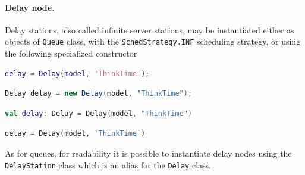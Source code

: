 \paragraph{Delay node.} Delay stations, also called infinite server stations, may be instantiated either as objects of \texttt{Queue} class, with the \texttt{SchedStrategy.INF} scheduling strategy, or using the following specialized constructor
\begin{MATLAB}
\begin{lstlisting}[language = matlab]
delay = Delay(model, 'ThinkTime');
\end{lstlisting}
\end{MATLAB}
\begin{JAVA}
\begin{lstlisting}[language = java, basicstyle=\ttfamily\scriptsize]
Delay delay = new Delay(model, "ThinkTime");
\end{lstlisting}
\end{JAVA}
\begin{KOTLIN}
\begin{lstlisting}[language = kotlin, basicstyle=\ttfamily\scriptsize]
val delay: Delay = Delay(model, "ThinkTime")
\end{lstlisting}
\end{KOTLIN}
\begin{PYTHON}
\begin{lstlisting}[language = python]
delay = Delay(model, 'ThinkTime')
\end{lstlisting}
\end{PYTHON}

As for queues, for readability it is possible to instantiate delay nodes using the \texttt{DelayStation} class which is an alias for the \texttt{Delay} class.

